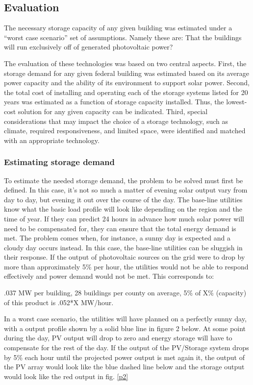 \subsection{Evaluation}
The necessary storage capacity of any given building was estimated under a
``worst case scenario'' set of assumptions. Namely these are:
That the buildings will run exclusively off of generated photovoltaic power?

The evaluation of these technologies was based on two central aspects. First,
the storage demand for any given federal building was estimated based on its
average power capacity and the ability of its environment to support solar
power. Second, the total cost of installing and operating each of the storage
systems listed for 20 years was estimated as a function of storage capacity
installed. Thus, the lowest-cost solution for any given capacity can be
indicated. Third, special considerations that may impact the choice of a
storage technology, such as climate, required responsiveness, and limited
space, were identified and matched with an appropriate technology.

\subsubsection{Estimating storage demand}

To estimate the needed storage demand, the problem to be solved must first be
defined. In this case, it's not so much a matter of evening solar output vary
from day to day, but evening it out over the course of the day. The base-line
utilities know what the basic load profile will look like depending on the
region and the time of year. If they can predict 24 hours in advance how much
solar power will need to be compensated for, they can ensure that the total
energy demand is met. The problem comes when, for instance, a sunny day is
expected and a cloudy day occurs instead. In this case, the base-line utilities
can be sluggish in their response. If the output of photovoltaic sources on the
grid were to drop by more than approximately 5\% per hour, the utilities would
not be able to respond effectively and power demand would not be met. This corresponds to:

.037 MW per building, 28 buildings per county on average, 5\% of X\% (capacity)
of this product is .052*X MW/hour.

In a worst case scenario, the utilities will have planned on a perfectly sunny
day, with a output profile shown by a solid blue line in figure 2 below. At
some point during the day, PV output will drop to zero and energy storage will
have to compensate for the rest of the day. If the output of the PV/Storage
system drops by 5\% each hour until the projected power output is met again it,
the output of the PV array would look like the blue dashed line below and the
storage output would look like the red output in fig. \ref{p2}

